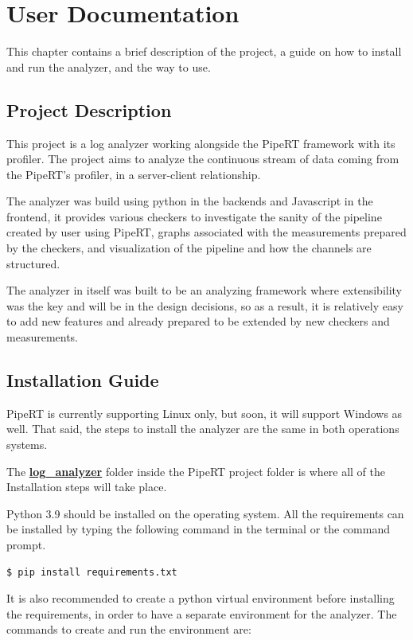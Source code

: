 \chapter{User Documentation} %
\label{ch:user}

This chapter contains a brief description of the project, a guide on how
to install and run the analyzer, and the way to use.

\section{Project Description} %
This project is a log analyzer working alongside the PipeRT framework
with its profiler. The project aims to analyze the continuous stream of
data coming from the PipeRT's profiler, in a server-client relationship.

The analyzer was build using python in the backends and Javascript in the frontend,
it provides various checkers to investigate the sanity of the pipeline created by
user using PipeRT, graphs associated with the measurements prepared by the checkers, and visualization
of the pipeline and how the channels are structured.

The analyzer in itself was built to be an analyzing framework where
extensibility was the key and will be in the design decisions, so as a result,
it is relatively easy to add new features and already prepared to be extended
by new checkers and measurements.


\section{Installation Guide}
PipeRT is currently supporting Linux only, but soon,
it will support Windows as well. That said, the steps to install
the analyzer are the same in both operations systems.

The \textbf{\url{log_analyzer}} folder inside the PipeRT project folder
is where all of the Installation steps will take place.

Python 3.9 should be installed on the operating system. All the
requirements can be installed by typing the following command in
the terminal or the command prompt.

\begin{lstlisting}[language=bash, caption={Install requirements},captionpos=b]
	$ pip install requirements.txt
\end{lstlisting}

It is also recommended to create a python virtual environment
before installing the requirements, in order to have a separate
environment for the analyzer. The commands to create and run the environment
are:


